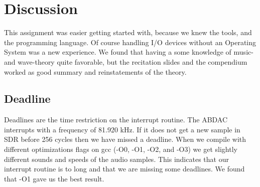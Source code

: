 \section{Discussion}
This assignment was easier getting started with, because we knew the tools,  
and the programming language.
Of course handling I/O devices without an Operating System was a new 
experience. We found that having a some
knowledge of music- and wave-theory quite favorable, but the recitation 
slides and the compendium worked as
good summary and reinstatements of the theory.

\subsection{Deadline}
Deadlines are the time restriction on the interrupt routine. The ABDAC interrupts 
with a frequency of 81.920 kHz.
If it does not get a new sample in SDR before 256 cycles then we have missed a 
deadline. When we compile with
different optimizations flags on gcc (-O0, -O1, -O2, and -O3) we get slightly 
different sounds and speeds of the
audio samples. This indicates that our interrupt routine is to long and that 
we are missing some deadlines.
We found that -O1 gave us the best result.
